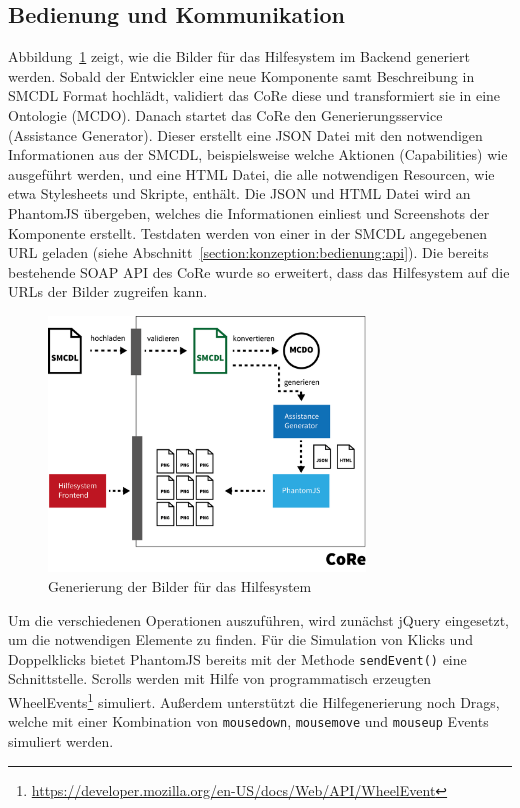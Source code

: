 \documentclass[
	headsepline,
	footsepline,
	fontsize=12pt,
	bibliography=totoc
]{scrbook}
\begin{document}
\subsection{Bedienung und Kommunikation}

Abbildung~\ref{figure:bedienung-backend} zeigt, wie die Bilder für das Hilfesystem im Backend generiert werden. Sobald der Entwickler eine neue Komponente samt Beschreibung in SMCDL Format hochlädt, validiert das CoRe diese und transformiert sie in eine Ontologie (MCDO). Danach startet das CoRe den Generierungsservice (Assistance Generator). Dieser erstellt eine JSON Datei mit den notwendigen Informationen aus der SMCDL, beispielsweise welche Aktionen (Capabilities) wie ausgeführt werden, und eine HTML Datei, die alle notwendigen Resourcen, wie etwa Stylesheets und Skripte, enthält. Die JSON und HTML Datei wird an PhantomJS übergeben, welches die Informationen einliest und Screenshots der Komponente erstellt. Testdaten werden von einer in der SMCDL angegebenen URL geladen (siehe Abschnitt~\ref{section:konzeption:bedienung:api}). Die bereits bestehende SOAP API des CoRe wurde so erweitert, dass das Hilfesystem auf die URLs der Bilder zugreifen kann.

\begin{figure}[htbp]
   \centering
   \includegraphics[width=0.75\textwidth]{images/implementierung-bedienung-backend.png}
   \caption{Generierung der Bilder für das Hilfesystem}
   \label{figure:bedienung-backend}
\end{figure}

Um die verschiedenen Operationen auszuführen, wird zunächst jQuery eingesetzt, um die notwendigen Elemente zu finden. Für die Simulation von Klicks und Doppelklicks bietet PhantomJS bereits mit der Methode \texttt{sendEvent()} eine Schnittstelle. Scrolls werden mit Hilfe von programmatisch erzeugten WheelEvents\footnote{\url{https://developer.mozilla.org/en-US/docs/Web/API/WheelEvent}} simuliert. Außerdem unterstützt die Hilfegenerierung noch Drags, welche mit einer Kombination von \texttt{mousedown}, \texttt{mousemove} und \texttt{mouseup} Events simuliert werden.
\end{document}
